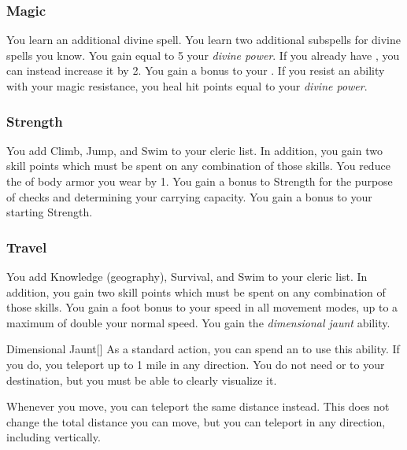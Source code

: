         \subsubsection{Magic}
             You learn an additional divine spell.
             You learn two additional subspells for divine spells you know.
             You gain  equal to 5 \add your \textit{divine power}.
            If you already have , you can instead increase it by 2.
             You gain a  bonus to your .
            If you resist an ability with your magic resistance, you heal hit points equal to your \textit{divine power}.

        \subsubsection{Strength}
             You add Climb, Jump, and Swim to your cleric  list.
            In addition, you gain two skill points which must be spent on any combination of those skills.
             You reduce the  of body armor you wear by 1.
             You gain a  bonus to Strength for the purpose of checks and determining your carrying capacity.
             You gain a  bonus to your starting Strength.

        \subsubsection{Travel}
             You add Knowledge (geography), Survival, and Swim to your cleric  list.
            In addition, you gain two skill points which must be spent on any combination of those skills.
             You gain a  foot bonus to your speed in all movement modes, up to a maximum of double your normal speed.
             You gain the \textit{dimensional jaunt} ability.
            \begin{ability}{Dimensional Jaunt}[]
                As a standard action, you can spend an  to use this ability.
                If you do, you teleport up to 1 mile in any direction.
                You do not need  or  to your destination, but you must be able to clearly visualize it.
            \end{ability}
             Whenever you move, you can teleport the same distance instead.
            This does not change the total distance you can move, but you can teleport in any direction, including vertically.

